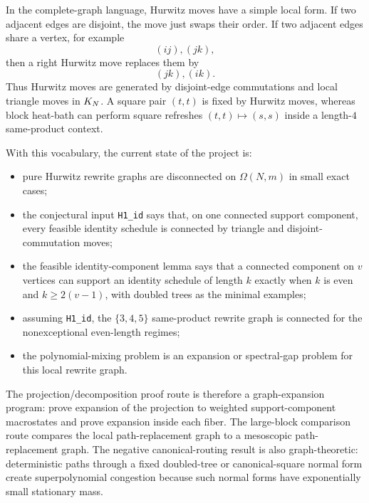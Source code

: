 In the complete-graph language, Hurwitz moves have a simple local form.  If
two adjacent edges are disjoint, the move just swaps their order.  If two
adjacent edges share a vertex, for example
\[
  (ij),(jk),
\]
then a right Hurwitz move replaces them by
\[
  (jk),(ik).
\]
Thus Hurwitz moves are generated by disjoint-edge commutations and local
triangle moves in $K_N$.  A square pair $(t,t)$ is fixed by Hurwitz moves,
whereas block heat-bath can perform square refreshes $(t,t)\mapsto (s,s)$
inside a length-$4$ same-product context.

With this vocabulary, the current state of the project is:
\begin{itemize}
\item pure Hurwitz rewrite graphs are disconnected on $\Omega(N,m)$ in small
  exact cases;
\item the conjectural input \texttt{H1\_id} says that, on one connected
  support component, every feasible identity schedule is connected by
  triangle and disjoint-commutation moves;
\item the feasible identity-component lemma says that a connected component
  on $v$ vertices can support an identity schedule of length $k$ exactly when
  $k$ is even and $k\ge 2(v-1)$, with doubled trees as the minimal examples;
\item assuming \texttt{H1\_id}, the $\{3,4,5\}$ same-product rewrite graph is
  connected for the nonexceptional even-length regimes;
\item the polynomial-mixing problem is an expansion or spectral-gap problem
  for this local rewrite graph.
\end{itemize}

The projection/decomposition proof route is therefore a graph-expansion
program: prove expansion of the projection to weighted support-component
macrostates and prove expansion inside each fiber.  The large-block comparison
route compares the local path-replacement graph to a mesoscopic
path-replacement graph.  The negative canonical-routing result is also
graph-theoretic: deterministic paths through a fixed doubled-tree or
canonical-square normal form create superpolynomial congestion because such
normal forms have exponentially small stationary mass.
